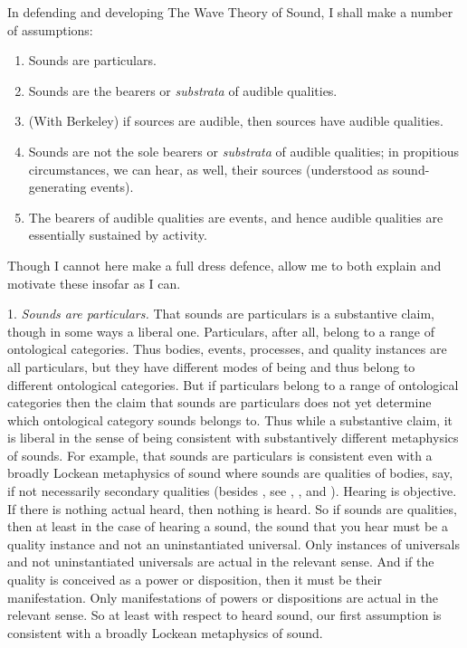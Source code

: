 \documentclass[12pt]{article}
\begin{document}
In defending and developing The Wave Theory of Sound, I shall make a number of assumptions:
\begin{enumerate}
	\item Sounds are particulars.
	\item Sounds are the bearers or \emph{substrata} of audible qualities.
	\item (With Berkeley) if sources are audible, then sources have audible qualities.
	\item Sounds are not the sole bearers or \emph{substrata} of audible qualities; in propitious circumstances, we can hear, as well, their sources (understood as sound-generating events).
	\item The bearers of audible qualities are events, and hence audible qualities are essentially sustained by activity.
\end{enumerate}
Though I cannot here make a full dress defence, allow me to both explain and motivate these insofar as I can.

1. \emph{Sounds are particulars.} That sounds are particulars is a substantive claim, though in some ways a liberal one. Particulars, after all, belong to a range of ontological categories. Thus bodies, events, processes, and quality instances are all particulars, but they have different modes of being and thus belong to different ontological categories. But if particulars belong to a range of ontological categories then the claim that sounds are particulars does not yet determine which ontological category sounds belongs to. Thus while a substantive claim, it is liberal in the sense of being consistent with substantively different metaphysics of sounds. For example, that sounds are particulars is consistent even with a broadly Lockean metaphysics of sound where sounds are qualities of bodies, say, if not necessarily secondary qualities (besides \citealt{Locke:1706hc}, see \citealt{Pasnau:1999ss}, \citealt{Kulvicki:2008aa}, and \citealt{Roberts:2017as}). Hearing is objective. If there is nothing actual heard, then nothing is heard. So if sounds are qualities, then at least in the case of hearing a sound, the sound that you hear must be a quality instance and not an uninstantiated universal. Only instances of universals and not uninstantiated universals are actual in the relevant sense. And if the quality is conceived as a power or disposition, then it must be their manifestation. Only manifestations of powers or dispositions are actual in the relevant sense. So at least with respect to heard sound, our first assumption is consistent with a broadly Lockean metaphysics of sound.
\end{document}
